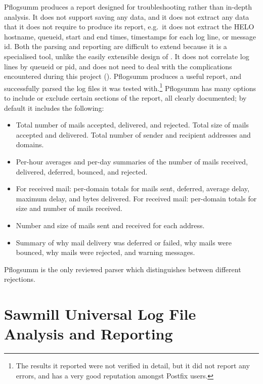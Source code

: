 Pflogsumm produces a report designed for troubleshooting rather than
in-depth analysis.  It does not support saving any data, and it does not
extract any data that it does not require to produce its report, e.g.\ it
does not extract the HELO hostname, queueid, start and end times,
timestamps for each log line, or message id.  Both the parsing and
reporting are difficult to extend because it is a specialised tool, unlike
the easily extensible design of \parsername{}.  It does not correlate log
lines by queueid or \gls{pid}, and does not need to deal with the
complications encountered during this project ().
Pflogsumm produces a useful report, and successfully parsed the
\numberOFlogFILES{} log files it was tested with.\footnote{The results it
reported were not verified in detail, but it did not report any errors, and
has a very good reputation amongst Postfix users.}  Pflogsumm has many
options to include or exclude certain sections of the report, all clearly
documented; by default it includes the following:

\begin{itemize}

    \item Total number of mails accepted, delivered, and rejected.  Total
        size of mails accepted and delivered.  Total number of sender and
        recipient addresses and domains.

    \item Per-hour averages and per-day summaries of the number of mails
        received, delivered, deferred, bounced, and rejected.

    \item For received mail: per-domain totals for mails sent, deferred,
        average delay, maximum delay, and bytes delivered.  For received
        mail: per-domain totals for size and number of mails received.

    \item Number and size of mails sent and received for each address.

    \item Summary of why mail delivery was deferred or failed, why mails
        were bounced, why mails were rejected, and warning messages.

\end{itemize}

Pflogsumm is the only reviewed parser which distinguishes between different
rejections.

\section{Sawmill Universal Log File Analysis and Reporting}

